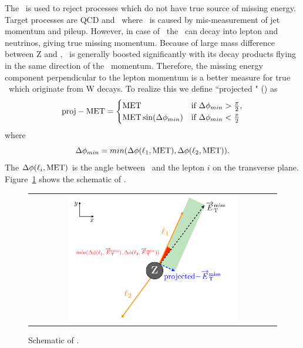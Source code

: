The \met\ is used to reject processes which do not have true source of missing energy. 
Target processes are QCD and \dyll\ where \met\ is caused by  
mis-measurement of jet momentum and pileup. However, in case of \dytt\, the \Tau\ can 
decay into lepton and neutrinos, giving true missing momentum. Because of large 
mass difference between Z and \Tau, \Tau\ is generally boosted significantly 
with its decay products flying in the same direction of the \Tau\ momentum. 
Therefore, the missing energy component perpendicular to the lepton momentum 
is a better measure for true \met\ which originate from W decays. 
To realize this we define ``projected \met " (\pmet) as 
\begin{equation}
\mathrm{proj-MET} 
= 
\begin{cases} \mathrm{MET} & \text{if $\Delta\phi_{min}>\frac{\pi}{2}$,}
\\
\mathrm{MET}\sin(\Delta\phi_{min}) & \text{if $\Delta\phi_{min}<\frac{\pi}{2}$}
\end{cases}
\end{equation}
where  
\begin{equation}
\Delta\phi_{min} =  min(\Delta\phi(\ell_1,\mathrm{MET}),\Delta\phi(\ell_2,\mathrm{MET})).
\end{equation}
The $\Delta\phi(\ell_i,\mathrm{MET})$ is the angle between \met\ and the lepton $i$ 
on the transverse plane. Figure~\ref{fig:projmetscheme} shows the schematic 
of \pmet. 
\begin{figure}[htp] 
\centering 
\begin{tabular}{c} 
\includegraphics[width=0.7\textwidth]{figures/projmet.pdf} 
\end{tabular} 
\caption{Schematic of \pmet.}
\label{fig:projmetscheme} 
\end{figure}  
%
